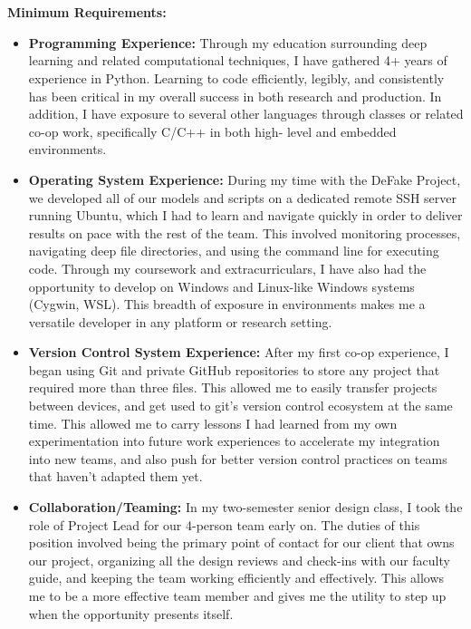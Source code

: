 \\\\
\textbf{Minimum Requirements:}
\begin{itemize}
    \item \textbf{Programming Experience:} Through my education
    surrounding deep learning and related computational techniques,
    I have gathered 4+ years of experience in Python. Learning
    to code efficiently, legibly, and consistently has been
    critical in my overall success in both research and production.
    In addition, I have exposure to several other languages through
    classes or related co-op work, specifically C/C++ in both high-
    level and embedded environments.

    \item \textbf{Operating System Experience:} During my time
    with the DeFake Project, we developed all of our models and
    scripts on a dedicated remote SSH server running Ubuntu, 
    which I had to learn and navigate quickly in order to deliver
    results on pace with the rest of the team. This involved
    monitoring processes, navigating deep file directories,
    and using the command line for executing code. Through
    my coursework and extracurriculars, I have also had the 
    opportunity to develop on Windows and Linux-like Windows 
    systems (Cygwin, WSL). This breadth of exposure in 
    environments makes me a versatile developer in any platform 
    or research setting.

    \item \textbf{Version Control System Experience:} After my 
    first co-op experience, I began using Git and private GitHub
    repositories to store any project that required more than 
    three files. This allowed me to easily transfer projects 
    between devices, and get used to git's version control 
    ecosystem at the same time. This allowed me to carry lessons
    I had learned from my own experimentation into future work 
    experiences to accelerate my integration into new teams,
    and also push for better version control practices on teams 
    that haven't adapted them yet.

    \item \textbf{Collaboration/Teaming:} In my two-semester 
    senior design class, I took the role of Project Lead for our 
    4-person team early on. The duties of this position involved
    being the primary point of contact for our client that owns
    our project, organizing all the design reviews and check-ins 
    with our faculty guide, and keeping the team working efficiently
    and effectively. This allows me to be a more effective team 
    member and gives me the utility to step up when the opportunity 
    presents itself.


\end{itemize}
